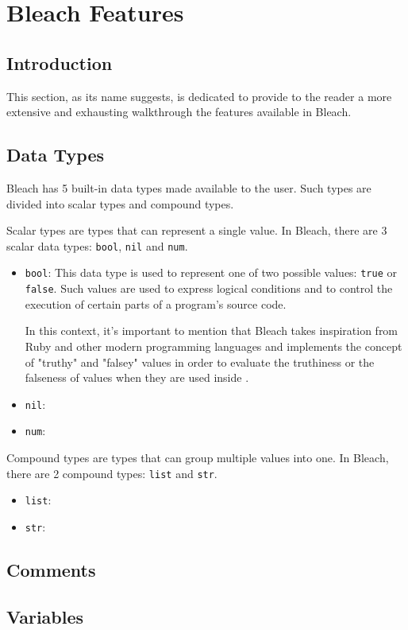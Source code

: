 \section{Bleach Features}
\subsection{Introduction}
This section, as its name suggests, is dedicated to provide to the reader a more extensive and exhausting walkthrough the features available in Bleach. 

\subsection{Data Types}
Bleach has 5 built-in data types made available to the user. Such types are divided into scalar types  and compound types.

Scalar types are types that can represent a single value. In Bleach, there are 3 scalar data types: \texttt{bool}, \texttt{nil} and \texttt{num}.
\begin{itemize}
    \item \texttt{bool}: This data type is used to represent one of two possible values: \texttt{true} or \texttt{false}. Such values are used to express logical conditions and to control the execution of certain parts of a program's source code.
    
    In this context, it's important to mention that Bleach takes inspiration from Ruby and other modern programming languages and implements the concept of "truthy" and "falsey" values in order to evaluate the truthiness or the falseness of values when they are used inside .
    
    \item \texttt{nil}:
    \item \texttt{num}:
\end{itemize}

Compound types are types that can group multiple values into one. In Bleach, there are 2 compound types: \texttt{list} and \texttt{str}.
\begin{itemize}
    \item \texttt{list}:
    \item \texttt{str}:
\end{itemize}

\subsection{Comments}
\subsection{Variables}
